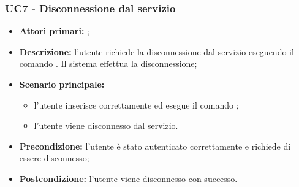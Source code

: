 \subsubsection{UC7 - Disconnessione dal servizio}
\begin{itemize}
	\item \textbf{Attori primari:} \ua{};
	\item \textbf{Descrizione:} l’utente richiede la disconnessione dal servizio eseguendo il comando \logout{}. Il sistema effettua la disconnessione; 
	\item \textbf{Scenario principale:} 
	\begin{itemize}
		\item l'utente inserisce correttamente ed esegue il comando \logout{}; 
		\item l'utente viene disconnesso dal servizio. 
	\end{itemize}
	\item \textbf{Precondizione:} l’utente è stato autenticato correttamente e richiede di essere disconnesso; 
	\item \textbf{Postcondizione:} l’utente viene disconnesso con successo.
\end{itemize}
